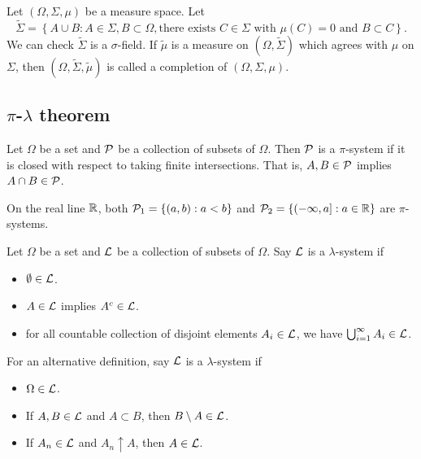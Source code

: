 \documentclass[a4paper]{article}
\begin{document}
\begin{defi}
  Let $(\Omega, \Sigma, \mu)$ be a measure space. Let
  \[
    \tilde{\Sigma} = \left\{ A \cup B : A \in \Sigma,
    B \subset \Omega, \text{there exists $C \in \Sigma$ with
  $\mu(C) = 0$ and $B \subset C$} \right\}.
  \]
  We can check $\tilde{\Sigma}$ is a $\sigma$-field. If $\tilde{\mu}$
  is a measure on $(\Omega, \tilde{\Sigma})$ which agrees with $\mu$
  on $\Sigma$, then $(\Omega, \tilde{\Sigma}, \tilde{\mu})$ is called
  a completion of $(\Omega, \Sigma, \mu)$.
\end{defi}

\subsection{$\pi$-$\lambda$ theorem}

\begin{defi}[$\pi$-system]
  Let $\Omega$ be a set and $\P$ be a collection of subsets of $\Omega$.
  Then $\P$ is a $\pi$-system if it is closed with respect to
  taking finite intersections. That is, $A, B \in \P$ implies $A \cap B
    \in \P$.
\end{defi}

\begin{eg}
  On the real line $\R$, both $\P_1 = \left\{ (a, b) : a < b \right\}$
  and $\P_2 = \left\{ (-\infty, a] : a \in \R \right\}$ are
  $\pi$-systems.

\end{eg}

\begin{defi}
  Let $\Omega$ be a set and $\L$ be a collection of subsets of $\Omega$.
  Say $\L$ is a $\lambda$-system if
  \begin{itemize}
    \item $\emptyset \in \L$.
    \item $A \in \L$ implies $A^c \in \L$.
    \item for all countable collection of disjoint elements $A_i \in \L$,
          we have $\cupinfi A_i \in \L$.
  \end{itemize}

  For an alternative definition, say $\L$ is a $\lambda$-system if
  \begin{itemize}
    \item $\Omega \in \L$.
    \item If $A, B \in \L$ and $A \subset B$, then $B \setminus A \in \L$.
    \item If $A_n \in \L$ and $A_n \uparrow A$, then $A \in \L$.
  \end{itemize}
\end{defi}
\end{document}
